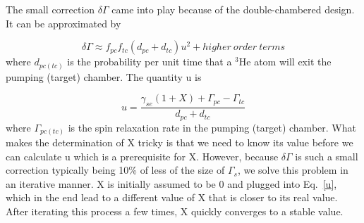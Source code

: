 The small correction $\delta\Gamma$ came into play because of the double-chambered design. It can be approximated by

\begin{equation}
\delta\Gamma\approx f_{pc}f_{tc}(d_{pc}+d_{tc})u^2 + higher~order~terms
\end{equation}
where $d_{pc(tc)}$ is the probability per unit time that a $^3$He atom will exit the pumping (target) chamber. The quantity u is 

\begin{equation}\label{u}
u=\frac{\gamma_{se}(1+X)+\Gamma_{pc}-\Gamma_{tc}}{d_{pc}+d_{tc}}
\end{equation}
where $\Gamma_{pc(tc)}$ is the spin relaxation rate in the pumping (target) chamber. What makes the determination of X tricky is that we need to know its value before we can calculate u which is a prerequisite for X. However, because $\delta\Gamma$ is such a small correction typically being 10\% of less of the size of $\Gamma_s$, we solve this problem in an iterative manner. X is initially assumed to be 0 and plugged into Eq.~\ref{u}, which in the end lead to a different value of X that is closer to its real value. After iterating this process a few times, X quickly converges to a stable value.


